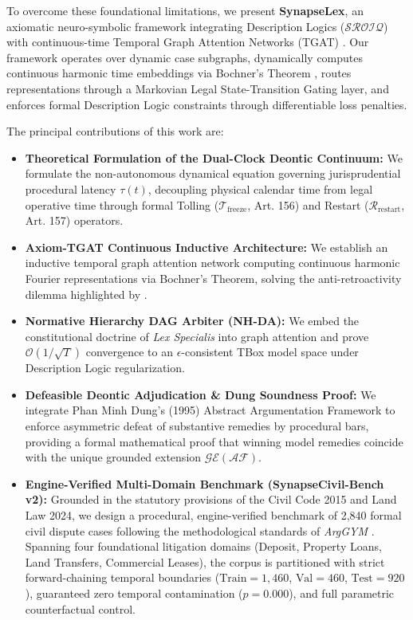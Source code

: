 \documentclass[11pt,a4paper]{article}
\begin{document}
To overcome these foundational limitations, we present \textbf{SynapseLex}, an axiomatic neuro-symbolic framework integrating Description Logics ($\mathcal{SROIQ}$) with continuous-time Temporal Graph Attention Networks (TGAT) \citep{xu2020inductive}. Our framework operates over dynamic case subgraphs, dynamically computes continuous harmonic time embeddings via Bochner's Theorem \citep{bochner1959lectures}, routes representations through a Markovian Legal State-Transition Gating layer, and enforces formal Description Logic constraints through differentiable loss penalties.

The principal contributions of this work are:
\begin{itemize}[leftmargin=*]
    \item \textbf{Theoretical Formulation of the Dual-Clock Deontic Continuum:} We formulate the non-autonomous dynamical equation governing jurisprudential procedural latency $\tau(t)$, decoupling physical calendar time from legal operative time through formal Tolling ($\mathcal{T}_{\text{freeze}}$, Art. 156) and Restart ($\mathcal{R}_{\text{restart}}$, Art. 157) operators.
    \item \textbf{Axiom-TGAT Continuous Inductive Architecture:} We establish an inductive temporal graph attention network computing continuous harmonic Fourier representations via Bochner's Theorem, solving the anti-retroactivity dilemma highlighted by \citet{fan2026legalsearch}.
    \item \textbf{Normative Hierarchy DAG Arbiter (NH-DA):} We embed the constitutional doctrine of \textit{Lex Specialis} into graph attention and prove $\mathcal{O}(1/\sqrt{T})$ convergence to an $\epsilon$-consistent TBox model space under Description Logic regularization.
    \item \textbf{Defeasible Deontic Adjudication \& Dung Soundness Proof:} We integrate Phan Minh Dung's (1995) Abstract Argumentation Framework to enforce asymmetric defeat of substantive remedies by procedural bars, providing a formal mathematical proof that winning model remedies coincide with the unique grounded extension $\mathcal{GE}(\mathcal{AF})$.
    \item \textbf{Engine-Verified Multi-Domain Benchmark (SynapseCivil-Bench v2):} Grounded in the statutory provisions of the Civil Code 2015 and Land Law 2024, we design a procedural, engine-verified benchmark of 2,840 formal civil dispute cases following the methodological standards of \textit{ArgGYM} \citep{deveci2026arggym}. Spanning four foundational litigation domains (Deposit, Property Loans, Land Transfers, Commercial Leases), the corpus is partitioned with strict forward-chaining temporal boundaries ($\text{Train} = 1,460$, $\text{Val} = 460$, $\text{Test} = 920$), guaranteed zero temporal contamination ($p = 0.000$), and full parametric counterfactual control.

\end{itemize}
\end{document}
